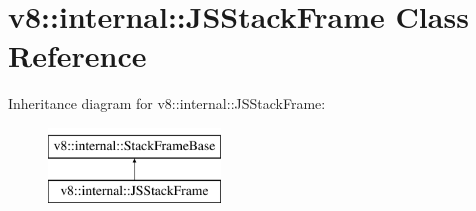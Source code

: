 \hypertarget{classv8_1_1internal_1_1JSStackFrame}{}\section{v8\+:\+:internal\+:\+:J\+S\+Stack\+Frame Class Reference}
\label{classv8_1_1internal_1_1JSStackFrame}
Inheritance diagram for v8\+:\+:internal\+:\+:J\+S\+Stack\+Frame\+:\begin{figure}[H]
\begin{center}
\leavevmode
\includegraphics[height=2.000000cm]{classv8_1_1internal_1_1JSStackFrame}
\end{center}
\end{figure}
